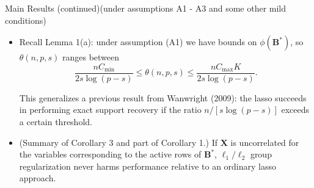 \documentclass[notes]{beamer}       %
\begin{document}
\begin{frame}{Main Results (continued)}{(under assumptions A1 - A3 and some other mild conditions)}
  \begin{itemize}
  \item{Recall Lemma 1(a): under assumption (A1) we have bounds on \(\phi(\boldsymbol{B}^*)\), so \( \theta(n,p,s)\) ranges between
  \begin{equation}\label{linreg.pres.mult.group.lasso.complexity.range}
     \frac{nC_{\text{min}}}{2 s\log(p - s)} \leq   \theta(n,p,s) \leq  \frac{nC_{\text{max}}K}{2 s\log(p - s)} .
   \end{equation}
  
This generalizes a previous result from Wanwright (2009): the lasso succeeds in performing exact support recovery if the ratio \(n/[s \log(p-s)]\) exceeds a certain threshold.
}
   
  \item{
    (Summary of Corollary 3 and part of Corollary 1.) If \(\boldsymbol{X}\) is uncorrelated for the variables corresponding to the active rows of \(\boldsymbol{B}^*\), \(\ell_1/\ell_2\) group regularization never harms performance relative to an ordinary lasso approach.
  }

  \end{itemize}
\end{frame}


\end{document}
